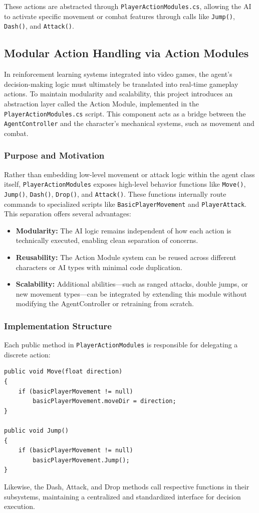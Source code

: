 \documentclass[12pt,oneside,openright,a4paper]{cpe-english-project}
\begin{document}
These actions are abstracted through \texttt{PlayerActionModules.cs}, allowing the AI to activate specific movement or combat features through calls like \texttt{Jump()}, \texttt{Dash()}, and \texttt{Attack()}.

\subsection{Modular Action Handling via Action Modules}
In reinforcement learning systems integrated into video games, the agent's decision-making logic must ultimately be translated into real-time gameplay actions. To maintain modularity and scalability, this project introduces an abstraction layer called the Action Module, implemented in the \texttt{PlayerActionModules.cs} script. This component acts as a bridge between the \texttt{AgentController} and the character's mechanical systems, such as movement and combat.

\subsubsection{Purpose and Motivation}
Rather than embedding low-level movement or attack logic within the agent class itself, \texttt{PlayerActionModules} exposes high-level behavior functions like \texttt{Move()}, \texttt{Jump()}, \texttt{Dash()}, \texttt{Drop()}, and \texttt{Attack()}. These functions internally route commands to specialized scripts like \texttt{BasicPlayerMovement} and \texttt{PlayerAttack}.
This separation offers several advantages:

\begin{itemize}
\item \textbf{Modularity:} The AI logic remains independent of how each action is technically executed, enabling clean separation of concerns.
\item \textbf{Reusability:} The Action Module system can be reused across different characters or AI types with minimal code duplication.
\item \textbf{Scalability:} Additional abilities—such as ranged attacks, double jumps, or new movement types—can be integrated by extending this module without modifying the AgentController or retraining from scratch.
\end{itemize}

\subsubsection{Implementation Structure}
Each public method in \texttt{PlayerActionModules} is responsible for delegating a discrete action:
\begin{lstlisting}[language={[Sharp]C}]
public void Move(float direction)
{
	if (basicPlayerMovement != null)
		basicPlayerMovement.moveDir = direction;
}

public void Jump()
{
	if (basicPlayerMovement != null)
		basicPlayerMovement.Jump();
}
\end{lstlisting}
Likewise, the Dash, Attack, and Drop methods call respective functions in their subsystems, maintaining a centralized and standardized interface for decision execution.\par
\end{document}
